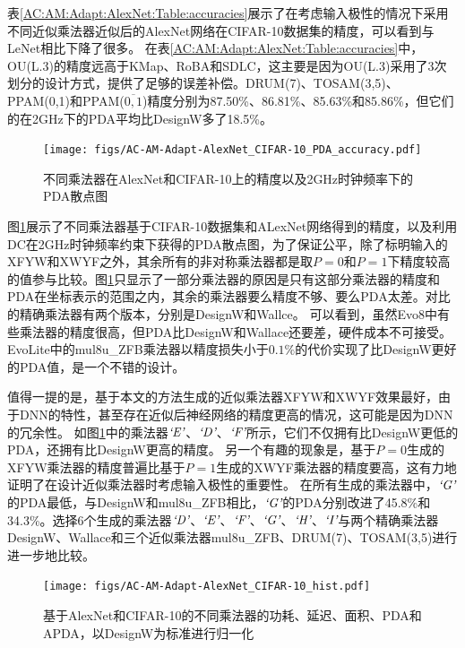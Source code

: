 表\ref{AC:AM:Adapt:AlexNet:Table:accuracies}展示了在考虑输入极性的情况下采用不同近似乘法器近似后的AlexNet网络在CIFAR-10数据集的精度，可以看到与LeNet相比下降了很多。
在表\ref{AC:AM:Adapt:AlexNet:Table:accuracies}中，OU(L.3)的精度远高于KMap、RoBA和SDLC，这主要是因为OU(L.3)采用了3次划分的设计方式，提供了足够的误差补偿。DRUM(7)、TOSAM(3,5)、PPAM(0,1)和PPAM($\overline{0,1}$)精度分别为87.50\%、86.81\%、85.63\%和85.86\%，但它们的在2GHz下的PDA平均比DesignW多了18.5\%。

\begin{figure}[!htb]
    \centering
    \texttt{[image: figs/AC-AM-Adapt-AlexNet\_CIFAR-10\_PDA\_accuracy.pdf]}
    \caption{不同乘法器在AlexNet和CIFAR-10上的精度以及2GHz时钟频率下的PDA散点图}
    \label{AC:AM:Adapt:Fig:AlexNet_CIFAR-10_PDA_accuracy}
\end{figure}

图\ref{AC:AM:Adapt:Fig:AlexNet_CIFAR-10_PDA_accuracy}展示了不同乘法器基于CIFAR-10\cite{DNN:CIFAR-10}数据集和ALexNet网络\cite{DNN:AlexNet}得到的精度，以及利用DC在2GHz时钟频率约束下获得的PDA散点图，为了保证公平，除了标明输入的XFYW和XWYF之外，其余所有的非对称乘法器都是取$P=0$和$P=1$下精度较高的值参与比较。图\ref{AC:AM:Adapt:Fig:AlexNet_CIFAR-10_PDA_accuracy}只显示了一部分乘法器的原因是只有这部分乘法器的精度和PDA在坐标表示的范围之内，其余的乘法器要么精度不够、要么PDA太差。对比的精确乘法器有两个版本，分别是DesignW和Wallce。
可以看到，虽然Evo8中有些乘法器的精度很高，但PDA比DesignW和Wallace还要差，硬件成本不可接受。EvoLite中的mul8u\_ZFB乘法器以精度损失小于$0.1\%$的代价实现了比DesignW更好的PDA值，是一个不错的设计。

值得一提的是，基于本文的方法生成的近似乘法器XFYW和XWYF效果最好，由于DNN的特性，甚至存在近似后神经网络的精度更高的情况，这可能是因为DNN的冗余性。
如图\ref{AC:AM:Adapt:Fig:AlexNet_CIFAR-10_PDA_accuracy}中的乘法器$\emph{`E'}$、$\emph{`D'}$、$\emph{`F'}$所示，它们不仅拥有比DesignW更低的PDA，还拥有比DesignW更高的精度。
另一个有趣的现象是，基于$P=0$生成的XFYW乘法器的精度普遍比基于$P=1$生成的XWYF乘法器的精度要高，这有力地证明了在设计近似乘法器时考虑输入极性的重要性。
在所有生成的乘法器中，$\emph{`G'}$的PDA最低，与DesignW和mul8u\_ZFB相比，$\emph{`G'}$的PDA分别改进了45.8\%和34.3\%。选择6个生成的乘法器$\emph{`D'}$、$\emph{`E'}$、$\emph{`F'}$、$\emph{`G'}$、$\emph{`H'}$、$\emph{`I'}$与两个精确乘法器DesignW、Wallace和三个近似乘法器mul8u\_ZFB、DRUM(7)、TOSAM(3,5)进行进一步地比较。

\begin{figure}[!htb]
    \centering
    \texttt{[image: figs/AC-AM-Adapt-AlexNet\_CIFAR-10\_hist.pdf]}
    \caption{基于AlexNet和CIFAR-10的不同乘法器的功耗、延迟、面积、PDA和APDA，以DesignW为标准进行归一化}
    \label{AC:AM:Adapt:Fig:ALexNet_CIFAR-10_hist}
\end{figure}

